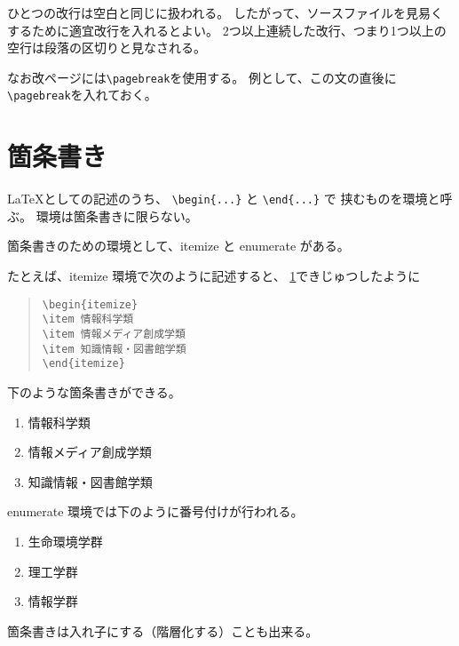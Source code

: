 \documentclass[fontsize=12pt, paper=a4]{jlreq}
\begin{document}
ひとつの改行は空白と同じに扱われる。
したがって、ソースファイルを見易くするために適宜改行を入れるとよい。
2つ以上連続した改行、つまり1つ以上の空行は段落の区切りと見なされる。

なお改ページには\verb|\pagebreak|を使用する。
例として、この文の直後に\verb|\pagebreak|を入れておく。


\pagebreak

\section{箇条書き}
\label{sec:kazyougaki}

\LaTeX としての記述のうち、
\verb+\begin{...}+ と \verb+\end{...}+ で
挟むものを環境と呼ぶ。
環境は箇条書きに限らない。

箇条書きのための環境として、itemize と enumerate がある。

たとえば、itemize 環境で次のように記述すると、
\ref{sec:kazyougaki}できじゅつしたように
\begin{quote}
\begin{verbatim}
\begin{itemize}
\item 情報科学類
\item 情報メディア創成学類
\item 知識情報・図書館学類
\end{itemize}
\end{verbatim}
\end{quote}
下のような箇条書きができる。

\begin{enumerate}
\item 情報科学類
\item 情報メディア創成学類
\item 知識情報・図書館学類
\end{enumerate}

enumerate 環境では下のように番号付けが行われる。

\begin{enumerate}
\item 生命環境学群
\item 理工学群
\item 情報学群
\end{enumerate}

箇条書きは入れ子にする（階層化する）ことも出来る。
\end{document}
